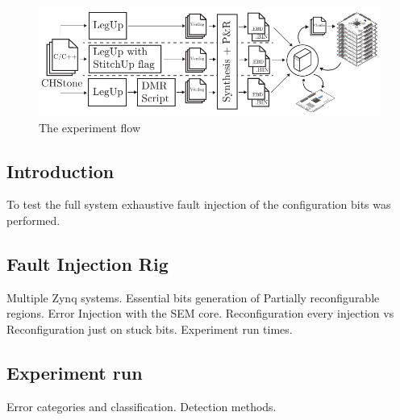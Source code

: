 
\begin{figure}[!t]
\centering
\includegraphics[width=6in]{./imgs/ExperimentFlow.pdf}
\caption{The experiment flow}
\label{fig:ExperimentFlow}
\end{figure}

\subsection{Introduction}
To test the full system exhaustive fault injection of the configuration bits was performed.

\subsection{Fault Injection Rig}
Multiple Zynq systems. Essential bits generation of Partially reconfigurable regions.
Error Injection with the SEM core. Reconfiguration every injection vs Reconfiguration just
on stuck bits. Experiment run times.

\subsection{Experiment run}
Error categories and classification.
Detection methods.

